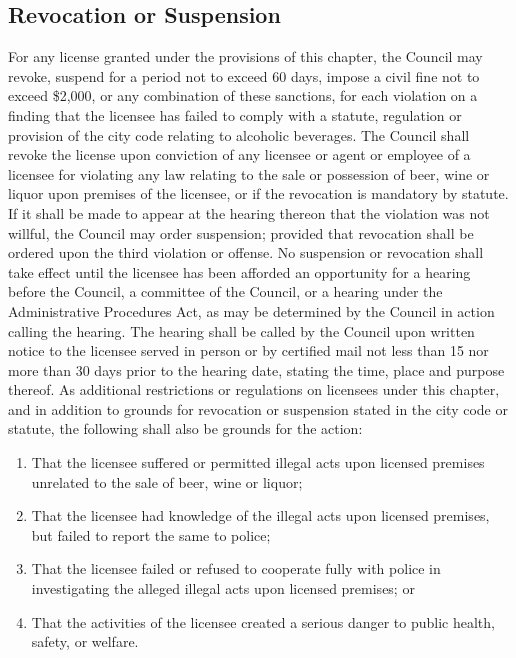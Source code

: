 \subsection{Revocation or Suspension}
For any license granted under the provisions of this chapter, the Council may revoke, suspend for a period not to exceed 60 days, impose a civil fine not to exceed \$2,000, or any combination of these sanctions, for each violation on a finding that the licensee has failed to comply with a statute, regulation or provision of the city code relating to alcoholic beverages. The Council shall revoke the license upon conviction of any licensee or agent or employee of a licensee for violating any law relating to the sale or possession of beer, wine or liquor upon premises of the licensee, or if the revocation is mandatory by statute. If it shall be made to appear at the hearing thereon that the violation was not willful, the Council may order suspension; provided that revocation shall be ordered upon the third violation or offense. No suspension or revocation shall take effect until the licensee has been afforded an opportunity for a hearing before the Council, a committee of the Council, or a hearing under the Administrative Procedures Act, as may be determined by the Council in action calling the hearing. The hearing shall be called by the Council upon written notice to the licensee served in person or by certified mail not less than 15 nor more than 30 days prior to the hearing date, stating the time, place and purpose thereof. As additional restrictions or regulations on licensees under this chapter, and in addition to grounds for revocation or suspension stated in the city code or statute, the following shall also be grounds for the action:
\begin{enumerate}[{\indent}1)]
    \item That the licensee suffered or permitted illegal acts upon licensed premises unrelated to the sale of beer, wine or liquor; 
    \item That the licensee had knowledge of the illegal acts upon licensed premises, but failed to report the same to police; 
    \item That the licensee failed or refused to cooperate fully with police in investigating the alleged illegal acts upon licensed premises; or
    \item That the activities of the licensee created a serious danger to public health, safety, or welfare.
\end{enumerate}
